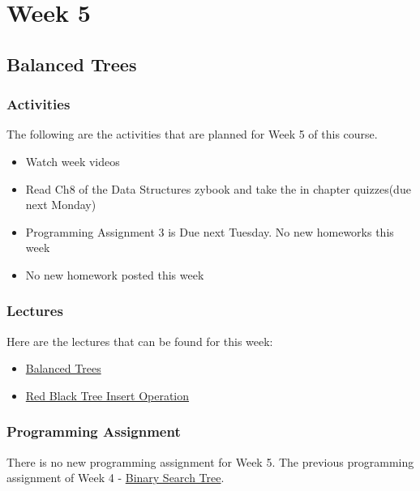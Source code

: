 \clearpage

\chapter{Week 5}

\section{Balanced Trees}

\horizontalline

\subsection{Activities}

The following are the activities that are planned for Week 5 of this course.

\begin{itemize}
    \item Watch week videos
    \item Read Ch8 of the Data Structures zybook and take the in chapter quizzes(due next Monday)
    \item Programming Assignment 3 is Due next Tuesday. No new homeworks this week
    \item No new homework posted this week
\end{itemize}

\subsection{Lectures}

Here are the lectures that can be found for this week:

\begin{itemize}
    \item \href{https://applied.cs.colorado.edu/mod/hvp/view.php?id=45925}{Balanced Trees}
    \item \href{https://applied.cs.colorado.edu/mod/hvp/view.php?id=45926}{Red Black Tree Insert Operation}
\end{itemize}

\subsection{Programming Assignment}

There is no new programming assignment for Week 5. The previous programming assignment of Week 4 - \href{https://github.com/cu-cspb-2270-Summer-2023/pa3-RelativiBit}{Binary Search Tree}.

